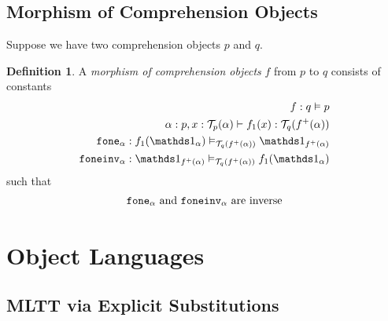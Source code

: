 \documentclass[10pt]{article}
\theoremstyle{definition}
\newtheorem{definition}{Definition}
\newcommand{\yields}{\vdash}
\newcommand\TrPlus[2]{\ensuremath{{#1}^+(#2)}}
\newcommand\El[2]{\mathcal{T}_{#1}(#2)}
\begin{document}
\subsection{Morphism of Comprehension Objects}
\newcommand\fone[1]{\ensuremath{\mathtt{fone}_{#1}}}
\newcommand\foneinv[1]{\ensuremath{\mathtt{foneinv}_{#1}}}

Suppose we have two comprehension objects $p$ and $q$.

\begin{definition}\label{def:morphism-comprehension-object}
A \emph{morphism of comprehension objects} $f$ from $p$ to $q$ consists of constants
\begin{align*}
f : q \vDash p \\
\alpha : p, x : \El{p}{\alpha} \yields f_1(x) : \El{q}{\TrPlus{f}{\alpha}} \\
\fone{\alpha} : f_1(\One_\alpha) \vDash_{\El{q}{\TrPlus{f}{\alpha}}} \One_{\TrPlus{f}{\alpha}} \\
\foneinv{\alpha} : \One_{\TrPlus{f}{\alpha}} \vDash_{\El{q}{\TrPlus{f}{\alpha}}} f_1(\One_\alpha)
\end{align*}
such that
\begin{align}
\text{$\fone{\alpha}$ and \foneinv{\alpha} are inverse}
\end{align}
\end{definition}


\section{Object Languages}

\subsection{MLTT via Explicit Substitutions}
\newcommand{\qyields}{\Vdash} \newcommand{\varsof}[1]{{#1}^\dagger}
\newcommand{\upstairs}[1]{\overline{#1}}
\newcommand{\downstairs}[1]{\underline{#1}}
\newcommand{\asdep}[1]{{#1}_p}
\newcommand\proj[1]{\ensuremath{\mathsf{proj}_{#1}}}
\newcommand\qvar[1]{\ensuremath{\mathsf{var}_{#1}}}
\newcommand\outof[1]{\ensuremath{\mathsf{outof}_{#1}}}
\newcommand\into[1]{\ensuremath{\mathsf{into}_{#1}}}
\end{document}
